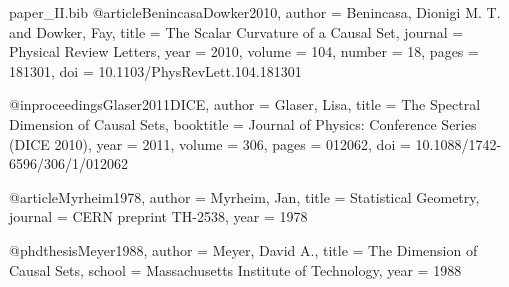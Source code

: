 
\begin{filecontents*}{paper_II.bib}
@article{BenincasaDowker2010,
  author  = {Benincasa, Dionigi M. T. and Dowker, Fay},
  title   = {The Scalar Curvature of a Causal Set},
  journal = {Physical Review Letters},
  year    = {2010},
  volume  = {104},
  number  = {18},
  pages   = {181301},
  doi     = {10.1103/PhysRevLett.104.181301}
}

@inproceedings{Glaser2011DICE,
  author    = {Glaser, Lisa},
  title     = {The Spectral Dimension of Causal Sets},
  booktitle = {Journal of Physics: Conference Series (DICE 2010)},
  year      = {2011},
  volume    = {306},
  pages     = {012062},
  doi       = {10.1088/1742-6596/306/1/012062}
}

@article{Myrheim1978,
  author  = {Myrheim, Jan},
  title   = {Statistical Geometry},
  journal = {CERN preprint TH-2538},
  year    = {1978}
}

@phdthesis{Meyer1988,
  author  = {Meyer, David A.},
  title   = {The Dimension of Causal Sets},
  school  = {Massachusetts Institute of Technology},
  year    = {1988}
}
\end{filecontents*}

\documentclass[11pt]{article}

\usepackage[margin=1in]{geometry}
\usepackage{amsmath,amssymb,amsthm,mathtools}
\usepackage{graphicx}
\usepackage{hyperref}
\usepackage{microtype}
\usepackage[numbers,sort&compress]{natbib}
\usepackage{xcolor}

\hypersetup{
  colorlinks=true,
  linkcolor=blue!50!black,
  citecolor=blue!50!black,
  urlcolor=blue!50!black
}

\makeatletter
{}
\makeatother
\graphicspath{{figs/}}

\theoremstyle{plain}
\newtheorem{theorem}{Theorem}
\newtheorem{proposition}[theorem]{Proposition}
\newtheorem{lemma}[theorem]{Lemma}
\theoremstyle{definition}
\newtheorem{definition}[theorem]{Definition}
\theoremstyle{remark}
\newtheorem{remark}[theorem]{Remark}

\newcommand{\E}{\mathbb{E}}
\newcommand{\Var}{\mathrm{Var}}
\newcommand{\Boxop}{\Box}
\newcommand{\MM}{d_{\mathrm{MM}}}

